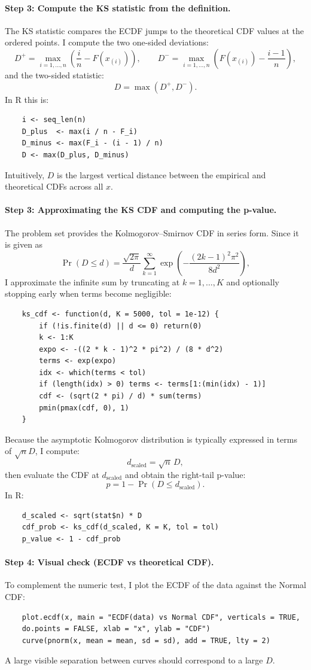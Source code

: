 \documentclass[12pt,letterpaper]{article}
\begin{document}
\paragraph{Step 3: Compute the KS statistic from the definition.}
The KS statistic compares the ECDF jumps to the theoretical CDF values at the ordered points. I compute the two one-sided deviations:
\[
D^+ = \max_{i=1,\dots,n}\left(\frac{i}{n} - F(x_{(i)})\right), \qquad
D^- = \max_{i=1,\dots,n}\left(F(x_{(i)}) - \frac{i-1}{n}\right),
\]
and the two-sided statistic:
\[
D = \max(D^+, D^-).
\]
In R this is:
\begin{verbatim}
	i <- seq_len(n)
	D_plus  <- max(i / n - F_i)
	D_minus <- max(F_i - (i - 1) / n)
	D <- max(D_plus, D_minus)
\end{verbatim}
Intuitively, $D$ is the largest vertical distance between the empirical and theoretical CDFs across all $x$.

\paragraph{Step 3: Approximating the KS CDF and computing the p-value.}
The problem set provides the Kolmogorov--Smirnov CDF in series form. Since it is given as
\[
\Pr(D \le d)
= \frac{\sqrt{2\pi}}{d}\sum_{k=1}^{\infty}\exp\!\left(-\frac{(2k-1)^2\pi^2}{8d^2}\right),
\]
I approximate the infinite sum by truncating at $k=1,\dots,K$ and optionally stopping early when terms become negligible:
\begin{verbatim}
	ks_cdf <- function(d, K = 5000, tol = 1e-12) {
		if (!is.finite(d) || d <= 0) return(0)
		k <- 1:K
		expo <- -((2 * k - 1)^2 * pi^2) / (8 * d^2)
		terms <- exp(expo)
		idx <- which(terms < tol)
		if (length(idx) > 0) terms <- terms[1:(min(idx) - 1)]
		cdf <- (sqrt(2 * pi) / d) * sum(terms)
		pmin(pmax(cdf, 0), 1)
	}
\end{verbatim}

Because the asymptotic Kolmogorov distribution is typically expressed in terms of $\sqrt{n}D$, I compute:
\[
d_{\text{scaled}} = \sqrt{n}\,D,
\]
then evaluate the CDF at $d_{\text{scaled}}$ and obtain the right-tail p-value:
\[
p = 1 - \Pr(D \le d_{\text{scaled}}).
\]
In R:
\begin{verbatim}
	d_scaled <- sqrt(stat$n) * D
	cdf_prob <- ks_cdf(d_scaled, K = K, tol = tol)
	p_value <- 1 - cdf_prob
\end{verbatim}

\paragraph{Step 4: Visual check (ECDF vs theoretical CDF).}
To complement the numeric test, I plot the ECDF of the data against the Normal CDF:
\begin{verbatim}
	plot.ecdf(x, main = "ECDF(data) vs Normal CDF", verticals = TRUE,
	do.points = FALSE, xlab = "x", ylab = "CDF")
	curve(pnorm(x, mean = mean, sd = sd), add = TRUE, lty = 2)
\end{verbatim}
A large visible separation between curves should correspond to a large $D$.
\end{document}
